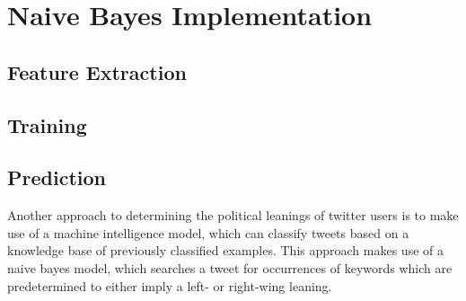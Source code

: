 \section{Naive Bayes Implementation}\label{sec:NBImp}


\subsection{Feature Extraction}

\subsection{Training}

\subsection{Prediction}


Another approach to determining the political leanings of twitter users is to
make use of a machine intelligence model, which can classify tweets based on a
knowledge base of previously classified examples. This approach makes use of a
naive bayes model, which searches a tweet for occurrences of keywords which are
predetermined to either imply a left- or right-wing leaning.
